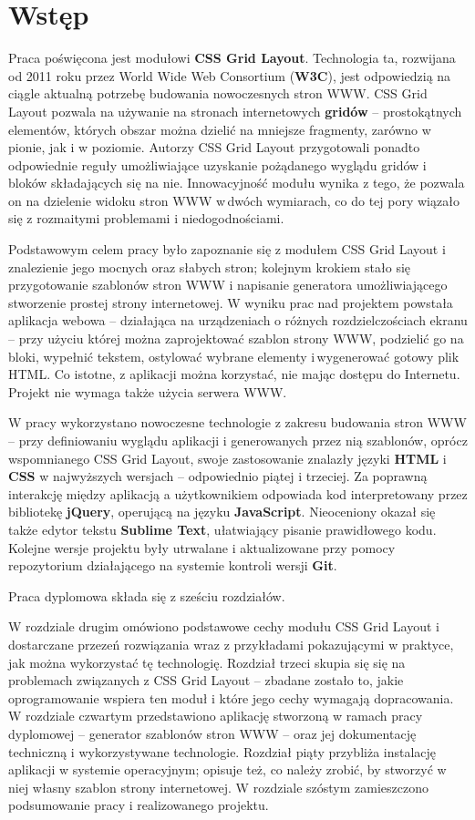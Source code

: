 \chapter{Wstęp}
\thispagestyle{chapterBeginStyle}

Praca poświęcona jest modułowi \textbf{CSS Grid Layout}. Technologia ta, rozwijana od 2011 roku przez World Wide Web Consortium (\textbf{W3C}), jest odpowiedzią na ciągle aktualną potrzebę budowania nowoczesnych stron WWW. CSS Grid Layout pozwala na używanie na stronach internetowych \textbf{gridów} -- prostokątnych elementów, których obszar można dzielić na mniejsze fragmenty, zarówno w pionie, jak i w poziomie. Autorzy CSS Grid Layout przygotowali ponadto odpowiednie reguły umożliwiające uzyskanie pożądanego wyglądu gridów i bloków składających się na nie. Innowacyjność modułu wynika z tego, że pozwala on na dzielenie widoku stron WWW w\,dwóch wymiarach, co do tej pory wiązało się z rozmaitymi problemami i niedogodnościami.

Podstawowym celem pracy było zapoznanie się z modułem CSS Grid Layout i znalezienie jego mocnych oraz słabych stron; kolejnym krokiem stało się przygotowanie szablonów stron WWW i napisanie generatora umożliwiającego stworzenie prostej strony internetowej. W wyniku prac nad projektem powstała aplikacja webowa -- działająca na urządzeniach o różnych rozdzielczościach ekranu -- przy użyciu której można zaprojektować szablon strony WWW, podzielić go na bloki, wypełnić tekstem, ostylować wybrane elementy i\,wygenerować gotowy plik HTML. Co istotne, z aplikacji można korzystać, nie mając dostępu do Internetu. Projekt nie wymaga także użycia serwera WWW.

W pracy wykorzystano nowoczesne technologie z zakresu budowania stron WWW -- przy definiowaniu wyglądu aplikacji i generowanych przez nią szablonów, oprócz wspomnianego CSS Grid Layout, swoje zastosowanie znalazły języki \textbf{HTML} i \textbf{CSS} w najwyższych wersjach -- odpowiednio piątej i trzeciej. Za poprawną interakcję między aplikacją a użytkownikiem odpowiada kod interpretowany przez bibliotekę \textbf{jQuery}, operującą na języku \textbf{JavaScript}. Nieoceniony okazał się także edytor tekstu \textbf{Sublime Text}, ułatwiający pisanie prawidłowego kodu. Kolejne wersje projektu były utrwalane i aktualizowane przy pomocy repozytorium działającego na systemie kontroli wersji \textbf{Git}.

Praca dyplomowa składa się z sześciu rozdziałów.

W rozdziale drugim omówiono podstawowe cechy modułu CSS Grid Layout i dostarczane przezeń rozwiązania wraz z przykładami pokazującymi w praktyce, jak można wykorzystać tę technologię. Rozdział trzeci skupia się się na problemach związanych z CSS Grid Layout -- zbadane zostało to, jakie oprogramowanie wspiera ten moduł i które jego cechy wymagają dopracowania. W rozdziale czwartym przedstawiono aplikację stworzoną w ramach pracy dyplomowej -- generator szablonów stron WWW -- oraz jej dokumentację techniczną i wykorzystywane technologie. Rozdział piąty przybliża instalację aplikacji w systemie operacyjnym; opisuje też, co należy zrobić, by stworzyć w niej własny szablon strony internetowej. W rozdziale szóstym zamieszczono podsumowanie pracy i realizowanego projektu.